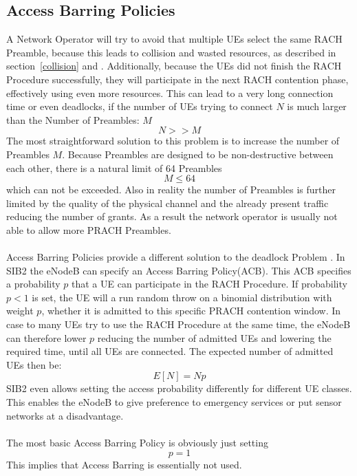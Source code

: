 \documentclass[conference]{IEEEtran}
\begin{document}
\subsection{Access Barring Policies}\label{ACB}
A Network Operator will try to avoid that multiple UEs select the same RACH Preamble, because this leads to collision and wasted resources, as described in section~\ref{collision} and \cite{3GPP_TR_37.868}.
Additionally, because the UEs did not finish the RACH Procedure successfully, they will participate in the next RACH contention phase, effectively using even more resources.
This can lead to a very long connection time or even deadlocks, if the number of UEs trying to connect $N$ is much larger than the Number of Preambles: $M$ \[N>>M\]
The most straightforward solution to this problem is to increase the number of Preambles $M$.
Because Preambles are designed to be non-destructive between each other, there is a natural limit of 64 Preambles \[M\leq64\] which can not be exceeded.
Also in reality the number of Preambles is further limited by the quality of the physical channel and the already present traffic reducing the number of grants.
As a result the network operator is usually not able to allow more PRACH Preambles.\\\\
Access Barring Policies provide a different solution to the deadlock Problem \cite{3GPP_TR_37.868}.
In SIB2 the eNodeB can specify an Access Barring Policy(ACB).
This ACB specifies a probability $p$ that a UE can participate in the RACH Procedure.
If probability $p<1$ is set, the UE will a run random throw on a binomial distribution with weight $p$, whether it is admitted to this specific PRACH contention window.
In case to many UEs try to use the RACH Procedure at the same time, the eNodeB can therefore lower $p$ reducing the number of admitted UEs and lowering the required time, until all UEs are connected.
The expected number of admitted UEs then be:\[E[N]= Np\]
SIB2 even allows setting the access probability differently for different UE classes.
This enables the eNodeB to give preference to emergency services or put sensor networks at a disadvantage.\\\\
The most basic Access Barring Policy is obviously just setting \[p=1\]
This implies that Access Barring is essentially not used.
\end{document}
